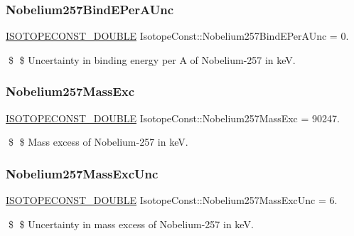\subsubsection{\texorpdfstring{Nobelium257\+Bind\+E\+Per\+A\+Unc}{Nobelium257BindEPerAUnc}}
{\footnotesize\ttfamily \mbox{\hyperlink{group___isotope_const-_macros_ga8f45a7272ce02c0b4c65c44636ed719a}{I\+S\+O\+T\+O\+P\+E\+C\+O\+N\+S\+T\+\_\+\+D\+O\+U\+B\+LE}} Isotope\+Const\+::\+Nobelium257\+Bind\+E\+Per\+A\+Unc = 0.}

\$ \$ Uncertainty in binding energy per A of Nobelium-\/257 in keV. \mbox{\label{group___isotope_const-_nobelium-_no257_gac8457fe8044afdd7a013508c1847619a}} 
\subsubsection{\texorpdfstring{Nobelium257\+Mass\+Exc}{Nobelium257MassExc}}
{\footnotesize\ttfamily \mbox{\hyperlink{group___isotope_const-_macros_ga8f45a7272ce02c0b4c65c44636ed719a}{I\+S\+O\+T\+O\+P\+E\+C\+O\+N\+S\+T\+\_\+\+D\+O\+U\+B\+LE}} Isotope\+Const\+::\+Nobelium257\+Mass\+Exc = 90247.}

\$ \$ Mass excess of Nobelium-\/257 in keV. \mbox{\label{group___isotope_const-_nobelium-_no257_ga3e30ec08e34176840f9b5089080fa41f}} 
\subsubsection{\texorpdfstring{Nobelium257\+Mass\+Exc\+Unc}{Nobelium257MassExcUnc}}
{\footnotesize\ttfamily \mbox{\hyperlink{group___isotope_const-_macros_ga8f45a7272ce02c0b4c65c44636ed719a}{I\+S\+O\+T\+O\+P\+E\+C\+O\+N\+S\+T\+\_\+\+D\+O\+U\+B\+LE}} Isotope\+Const\+::\+Nobelium257\+Mass\+Exc\+Unc = 6.}

\$ \$ Uncertainty in mass excess of Nobelium-\/257 in keV. \mbox{\label{group___isotope_const-_nobelium-_no257_gab94cd6c9f5c102bfc9474bbccd1d37cd}} 
